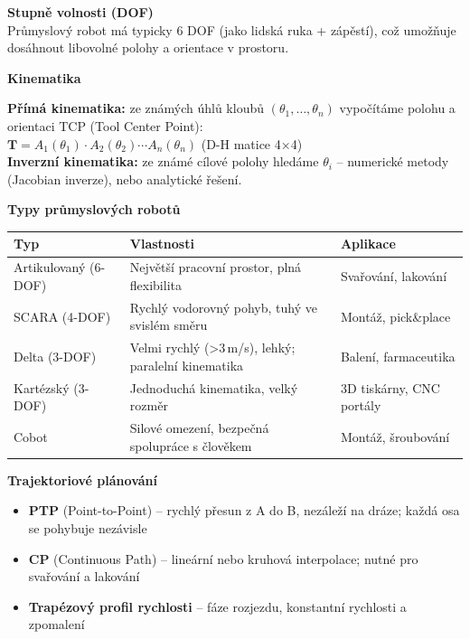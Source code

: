 \documentclass[a4paper,10pt]{article}
\begin{document}
\begin{vysvetlenibox}
\textbf{Stupně volnosti (DOF)}\\
Průmyslový robot má typicky 6 DOF (jako lidská ruka + zápěstí),
což umožňuje dosáhnout libovolné polohy a orientace v prostoru.

\textbf{Kinematika}

\begin{vzorcebox}
\textbf{Přímá kinematika:} ze známých úhlů kloubů $(\theta_1,\ldots,\theta_n)$
vypočítáme polohu a orientaci TCP (Tool Center Point):\\
$\mathbf{T} = A_1(\theta_1) \cdot A_2(\theta_2) \cdots A_n(\theta_n)$
\quad (D-H matice 4×4)\\[4pt]
\textbf{Inverzní kinematika:} ze známé cílové polohy hledáme $\theta_i$ --
numerické metody (Jacobian inverze), nebo analytické řešení.
\end{vzorcebox}

\textbf{Typy průmyslových robotů}

\begin{center}
\begin{tabularx}{0.95\linewidth}{@{} l X l @{}}
    \toprule
    \textbf{Typ} & \textbf{Vlastnosti} & \textbf{Aplikace} \\
    \midrule
    Artikulovaný (6-DOF) & Největší pracovní prostor, plná flexibilita
                         & Svařování, lakování \\
    SCARA (4-DOF)        & Rychlý vodorovný pohyb, tuhý ve svislém směru
                         & Montáž, pick\&place \\
    Delta (3-DOF)        & Velmi rychlý (\textgreater3\,m/s), lehký; paralelní kinematika
                         & Balení, farmaceutika \\
    Kartézský (3-DOF)    & Jednoduchá kinematika, velký rozměr
                         & 3D tiskárny, CNC portály \\
    Cobot                & Silové omezení, bezpečná spolupráce s člověkem
                         & Montáž, šroubování \\
    \bottomrule
\end{tabularx}
\end{center}

\textbf{Trajektoriové plánování}
\begin{itemize}[noitemsep, leftmargin=1.4em, topsep=4pt]
    \item \textbf{PTP} (Point-to-Point) -- rychlý přesun z A do B,
          nezáleží na dráze; každá osa se pohybuje nezávisle
    \item \textbf{CP} (Continuous Path) -- lineární nebo kruhová interpolace;
          nutné pro svařování a lakování
    \item \textbf{Trapézový profil rychlosti} -- fáze rozjezdu,
          konstantní rychlosti a zpomalení
\end{itemize}
\end{vysvetlenibox}
\end{document}
